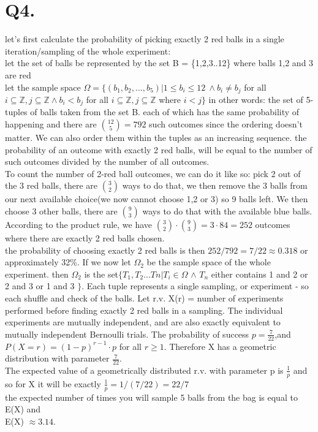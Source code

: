 \documentclass{report}
\begin{document}
\section*{Q4.}
let's first calculate the probability of picking exactly 2 red balls in a single iteration/sampling of the whole experiment:\\
let the set of balls be represented by the set B = \{1,2,3..12\}
where balls 1,2 and 3 are red\\
let the sample space $\Omega =\{(b_{1},b_{2},...,b_{5})| 1 \leq b_{i} \leq 12\ \wedge b_{i} \neq b_{j}$  for all $i \subseteq \mathbb{Z},j\subseteq \mathbb{Z} \wedge b_{i} < b_{j}$ for all  $i \subseteq \mathbb{Z}, j \subseteq \mathbb{Z}$ where $i < j\}$ in other words: the set of 5-tuples of balls taken from the set B.
each of which has the same probability of happening and there are ${12 \choose 5} = 792$ such outcomes since the ordering doesn't matter. We can also order them within the tuples as an increasing sequence.
the probability of an outcome with exactly 2 red balls, will be equal to the number of such outcomes divided by the number of all outcomes.\\ \break
To count the number of 2-red ball outcomes, we can do it like so:
pick 2 out of the 3 red balls, there are ${3\choose 2}$ ways to do that, we then remove the 3 balls from our next available choice(we now cannot choose 1,2 or 3) so 9 balls left. We then choose 3 other balls, there are $9 \choose 3$ ways to do that with the available blue balls.
According to the product rule, we have ${3\choose 2} \cdot {9 \choose 3} = 3 \cdot 84 = 252$ outcomes where there are exactly 2 red balls chosen. \\ \break
the probability of choosing exactly 2 red balls is then $252/792 = 7/22 \approx 0.318$ or approximately 32\%.
If we now let $\Omega_{2}$ be the sample space of the whole experiment. then $\Omega_{2}$ is the set$\{T_{1},T_{2}...T{n} | T_{i} \in \Omega$ $\wedge $ $T_{n}$ either contains 1 and 2 or 2 and 3 or 1 and 3 $\}$.
Each tuple represents a single sampling, or experiment - so each shuffle and check of the balls.
Let r.v. X(r) = number of experiments performed before finding exactly 2 red balls in a sampling. The individual experiments are mutually independent, and are also exactly equivalent to mutually independent Bernoulli trials. The probability of success $p = \frac{7}{22}$,and $P(X = r) = (1-p)^{r-1} \cdot p$  for all $r \geq 1$. Therefore X has a geometric distribution with parameter $\frac{7}{22}$. \\ The expected value of a geometrically distributed r.v. with parameter p is $\frac{1}{p}$ and so for X it will be exactly $\frac{1}{p} = 1/(7/22) = 22/7 $ \\ \break
the expected number of times you will sample 5 balls from the bag  is equal to E(X) and \\ \break 
E(X) $\approx 3.14$.
\end{document}
